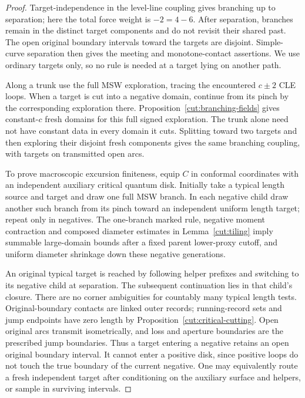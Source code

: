 \begin{proof}
Target-independence in the level-line coupling gives branching up to separation; here the total force weight is $-2=4-6$.  After separation, branches remain in the distinct target components and do not revisit their shared past.  The open original boundary intervals toward the targets are disjoint.  Simple-curve separation then gives the meeting and monotone-contact assertions.  We use ordinary targets only, so no rule is needed at a target lying on another path.

Along a trunk use the full MSW exploration, tracing the encountered $c\pm2$ CLE loops.  When a target is cut into a negative domain, continue from its pinch by the corresponding exploration there.  Proposition~\ref{cut:branching-fields} gives constant-$c$ fresh domains for this full signed exploration.  The trunk alone need not have constant data in every domain it cuts.  Splitting toward two targets and then exploring their disjoint fresh components gives the same branching coupling, with targets on transmitted open arcs.

To prove macroscopic excursion finiteness, equip $C$ in conformal coordinates with an independent auxiliary critical quantum disk.  Initially take a typical length source and target and draw one full MSW branch.  In each negative child draw another such branch from its pinch toward an independent uniform length target; repeat only in negatives.  The one-branch marked rule, negative moment contraction and composed diameter estimates in Lemma~\ref{cut:tiling} imply summable large-domain bounds after a fixed parent lower-proxy cutoff, and uniform diameter shrinkage down these negative generations.

An original typical target is reached by following helper prefixes and switching to its negative child at separation.  The subsequent continuation lies in that child's closure.  There are no corner ambiguities for countably many typical length tests.  Original-boundary contacts are linked outer records; running-record sets and jump endpoints have zero length by Proposition~\ref{cut:critical-cutting}.  Open original arcs transmit isometrically, and loss and aperture boundaries are the prescribed jump boundaries.  Thus a target entering a negative retains an open original boundary interval.  It cannot enter a positive disk, since positive loops do not touch the true boundary of the current negative.  One may equivalently route a fresh independent target after conditioning on the auxiliary surface and helpers, or sample in surviving intervals.


\end{proof}
